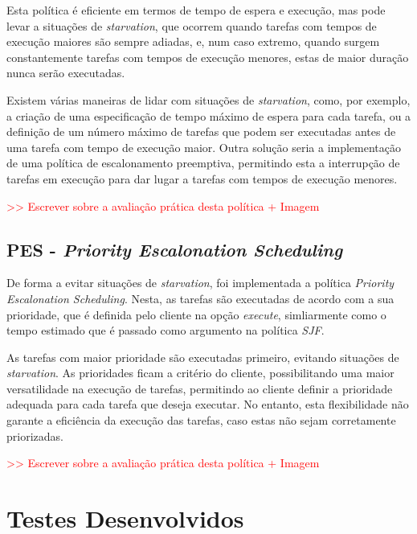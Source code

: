 \documentclass[a4paper,11pt]{scrreprt}
\begin{document}
        Esta política é eficiente em termos de tempo de espera e execução, mas pode levar
        a situações de \textit{starvation}, que ocorrem quando tarefas com tempos de execução
        maiores são sempre adiadas, e, num caso extremo, quando surgem constantemente tarefas
        com tempos de execução menores, estas de maior duração nunca serão executadas.

        Existem várias maneiras de lidar com situações de \textit{starvation}, como, por exemplo,
        a criação de uma especificação de tempo máximo de espera para cada tarefa, ou a
        definição de um número máximo de tarefas que podem ser executadas antes de uma
        tarefa com tempo de execução maior. Outra solução seria a implementação de uma
        política de escalonamento preemptiva, permitindo esta a interrupção de tarefas em
        execução para dar lugar a tarefas com tempos de execução menores.

        \textcolor{red}{>> Escrever sobre a avaliação prática desta política + Imagem}
    \section{\textbf{PES} - \textit{Priority Escalonation Scheduling}}
        De forma a evitar situações de \textit{starvation}, foi implementada a política
        \textit{Priority Escalonation Scheduling}. Nesta, as tarefas são executadas
        de acordo com a sua prioridade, que é definida pelo cliente na opção \textit{execute},
        simliarmente como o tempo estimado que é passado como argumento na política \textit{SJF}.

        As tarefas com maior prioridade são executadas primeiro, evitando
        situações de \textit{starvation}. As prioridades ficam a critério do cliente,
        possibilitando uma maior versatilidade na execução de tarefas, permitindo ao cliente
        definir a prioridade adequada para cada tarefa que deseja executar. No entanto, esta
        flexibilidade não garante a eficiência da execução das tarefas, caso estas não sejam
        corretamente priorizadas.

        \textcolor{red}{>> Escrever sobre a avaliação prática desta política + Imagem}

\chapter{Testes Desenvolvidos}

\end{document}
